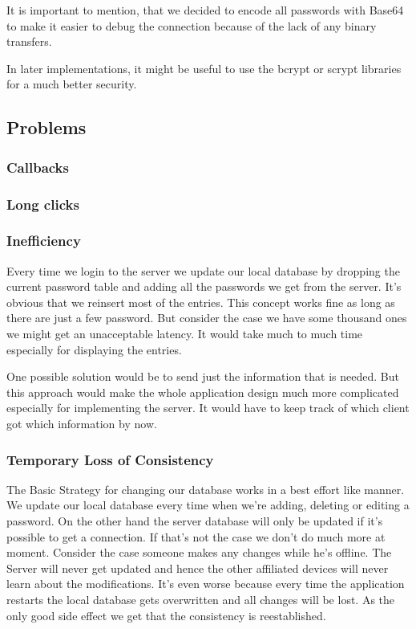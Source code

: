 \documentclass{report}
\begin{document}
It is important to mention, that we decided to encode all passwords with Base64 to make it easier to debug the connection because of the lack of any binary transfers.

In later implementations, it might be useful to use the bcrypt or scrypt libraries for a much better security. 

\subsection{Problems}



\subsubsection{Callbacks}


\subsubsection{Long clicks}


\subsubsection{Inefficiency}
Every time we login to the server we update our local database by 
dropping the current password table and adding all the passwords we get from the server. It's obvious that we reinsert most of the entries. This concept works fine as long as there are just a few password. But consider the case we have some thousand ones we might get an unacceptable latency. It would take much to much time especially for displaying the entries. 

One possible solution would be to send just the information that is needed. But this approach would make the whole application design much more complicated especially for implementing the server. It would have to keep track of which client got which information by now.

\subsubsection{Temporary Loss of Consistency}
The Basic Strategy for changing our database works in a best effort like manner. We update our local database every time when we're adding, deleting or editing a password. On the other hand the server database will only be updated if it's possible to get a connection. If that's not the case we don't do much more at moment.
Consider the case someone makes any changes while he's offline. The Server will never get updated and hence the other affiliated devices will never learn about the modifications. It's even worse because every time the application restarts the local database gets overwritten and all changes will be lost. As the only good side effect we get that the consistency is reestablished.
\end{document}

